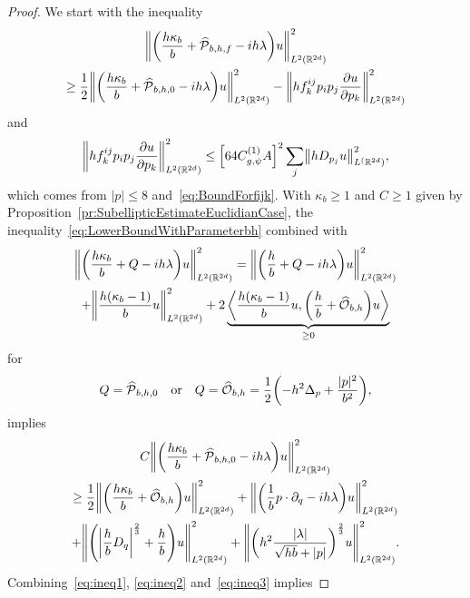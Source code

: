 \documentclass[10pt]{amsart}
\theoremstyle{definition}\newtheorem{defi}[theo]{Definition}\newtheorem{rema}[theo]{Remark}\newtheorem{exam}[theo]{Example}\newtheorem{exem}[theo]{Example}\newtheorem{nota}[theo]{Notation}
\newcommand{\R}{\mathbb{R}}
\newcommand{\clO}{\mathcal{O}}
\newcommand{\clP}{\mathcal{P}}
\newcommand\norm[1]{\left\lVert#1\right\rVert}
\let\oldhat\hat
\renewcommand*{\hat}[1]{\mathchoice{\widehat{#1}}{\widehat{#1}}{\oldhat{#1}}{\oldhat{#1}}}
\let\originalleft\left
\let\originalright\right
\renewcommand{\left}{\mathopen{}\mathclose\bgroup\originalleft}
\renewcommand{\right}{\aftergroup\egroup\originalright}
\begin{document}
\begin{proof}
We start with the inequality
\begin{multline}\label{eq:ineq1}
\left\| \left(\frac{h\kappa_b}{b} + \hat{\clP}_{b,h,f} - i h\lambda \right) u \right\|_{L^2(\R^{2d})}^{2}\\
\geq \frac{1}{2} \left\| \left(\frac{h\kappa_b}{b}+\hat{\clP}_{b,h,0} -i h\lambda \right) u\right\|_{L^2(\R^{2d})}^2- \left\| h f^{ij}_{k}p_{i}p_{j}\frac{\partial u}{\partial p_{k}} \right\|_{L^2(\R^{2d})}^{2}
\end{multline}
and
\begin{equation}\label{eq:ineq2}
\left\|hf^{ij}_k p_ip_j \frac{\partial u}{ \partial p_k}\right\|_{L^2(\R^{2d})}^2\leq \left[64 C_{g,\psi}^{(1)} A\right]^2 \sum_j\left\|hD_{p_j} u \right\|_{L^(\R^{2d})}^2,
\end{equation}
which comes from $|p|\leq 8$ and~\eqref{eq:BoundForfijk}. With $\kappa_b\geq 1$ and $C\geq 1$ given by Proposition~\ref{pr:SubellipticEstimateEuclidianCase}, the inequality~\eqref{eq:LowerBoundWithParameterbh} combined with
\begin{multline*}
\norm{\left(\frac{h\kappa_b}{b}+Q-ih\lambda\right)u}_{L^2(\R^{2d})}^2 =\norm{\left(\frac{h}{b}+Q-ih\lambda\right)u}_{L^2(\R^{2d})}^2\\
+\norm{\frac{h(\kappa_b-1)}{b}u}_{L^2(\R^{2d})}^2
+2\underbrace{\left\langle \frac{h(\kappa_b-1)}{b}u, \left(\frac{h}{b}+\hat{\clO}_{b,h}\right)u\right\rangle}_{\geq 0}
\end{multline*}
for 
\begin{align*}
Q =\hat{\clP}_{b,h,0}\quad\text{or}\quad Q=\hat{\clO}_{b,h}=\frac{1}{2}\left(-h^2\Delta_p+\frac{|p|^2}{b^2}\right),
\end{align*}
implies
\begin{multline}\label{eq:ineq3}
C \left\| \left(\frac{ h\kappa_b}{b} + \hat{\clP}_{b,h,0} - i h\lambda \right) u \right\|_{L^2(\R^{2d})}^{2} \\
\geq \frac{1}{2}
\left\| \left(\frac{h\kappa_b}{b}+\hat{\clO}_{b,h}\right) u \right\|_{L^2(\R^{2d})}^{2} +
\left\| \left(\frac{1}{b} p\cdot\partial_q-i h\lambda \right)u \right\|_{L^2(\R^{2d})}^{2}
\\+ \left\| \left(\left|\frac{h}{b}D_{q} \right|^{\frac{2}{3}} + \frac{h}{b}\right) u \right\|_{L^2(\R^{2d})}^{2} + \left\| \left(h^2 \frac{|\lambda|}{\sqrt{hb}+|p|} \right)^{\frac{2}{3}} u \right\|_{L^2(\R^{2d})}^{2}.
\end{multline}
Combining~\eqref{eq:ineq1}, \eqref{eq:ineq2} and~\eqref{eq:ineq3} implies

\end{proof}
\end{document}
